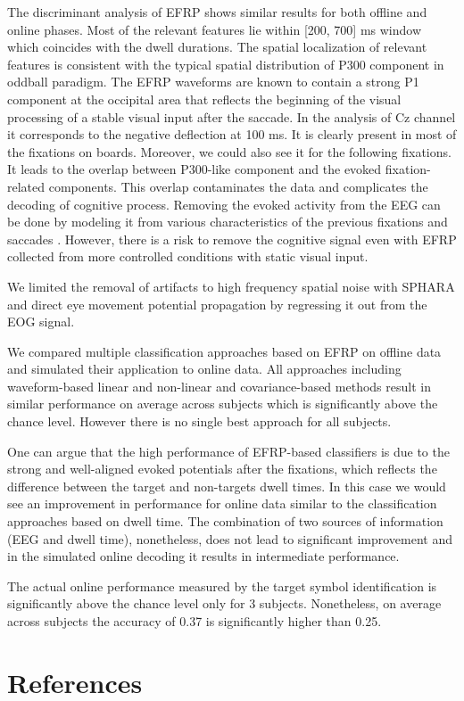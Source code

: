 \documentclass[12pt]{iopart}
\begin{document}
The discriminant analysis of EFRP shows similar results for both
offline and online phases. Most of the relevant
features lie within [200, 700] ms window which coincides with the dwell
durations. The spatial localization of relevant features is consistent with the typical
spatial distribution of P300 component in oddball paradigm.
The EFRP waveforms are known to contain a strong P1 component at the occipital
area that reflects the beginning of the visual processing of a stable visual input
after the saccade. In the analysis of Cz channel it corresponds to the negative
deflection at 100 ms. It is clearly present in most of the fixations on boards.
Moreover, we could also see it for the following fixations.
It leads to the overlap between P300-like component and 
the evoked fixation-related components. This overlap contaminates the
data and complicates the decoding of cognitive process.
Removing the evoked activity from the EEG can be done
by modeling it from various characteristics of the previous fixations and saccades \cite{}.
However, there is a risk to remove the cognitive signal even with EFRP collected
from more controlled conditions with static visual input.

We limited the removal of artifacts to high frequency spatial noise with SPHARA 
and direct eye movement potential propagation by regressing it out 
from the EOG signal.

We compared multiple classification approaches based on EFRP on offline data and 
simulated their application to online data.
All approaches including waveform-based linear and non-linear and covariance-based 
methods result in similar performance on average across subjects
which is significantly above the chance level.
However there is no single best approach for all subjects.

One can argue that the high performance of EFRP-based classifiers is
due to the strong and well-aligned evoked potentials after the fixations,
which reflects the difference between the target and non-targets dwell times.
In this case we would see an improvement in performance for online data
similar to the classification approaches based on dwell time.
The combination of two sources of information (EEG and dwell time), nonetheless,
does not lead to significant improvement and in the simulated online
decoding it results in intermediate performance.

The actual online performance measured by the target symbol identification
is significantly above the chance level only for 3 subjects.
Nonetheless, on average across subjects the accuracy of 0.37 is 
significantly higher than 0.25.



\section*{References}



\end{document}
